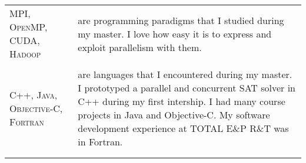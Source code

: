 \begin{tabular}{p{2cm}|p{11cm}}

\textsc{MPI, OpenMP, CUDA, Hadoop} & are programming paradigms that I studied during my master. I love how easy it is to express and exploit parallelism with them.\\
\multicolumn{2}{c}{} \\

\textsc{C++, \newline Java, Objective-C, Fortran} & are languages that I encountered during my master.
I prototyped a parallel and concurrent SAT solver in C++ during my first intership.
I had many course projects in Java and Objective-C.
My software development experience at \textsc{TOTAL E\&P R\&T} was in Fortran.\\
\multicolumn{2}{c}{} \\

\multicolumn{2}{c}{} \\

\end{tabular}
